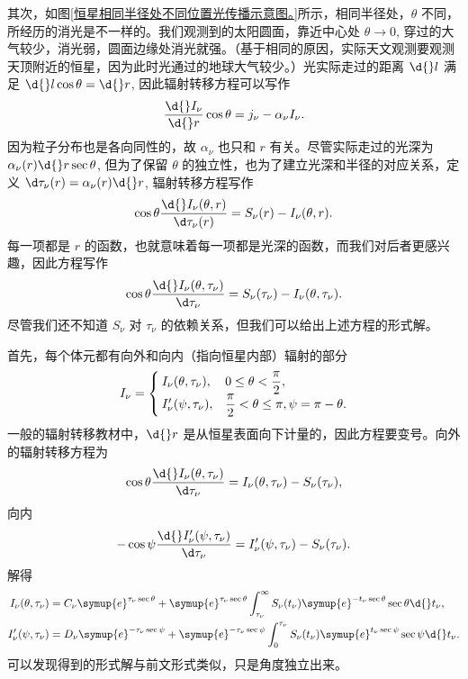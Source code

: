 \documentclass[../天体物理基础.tex]{subfiles}
\begin{document}
其次，如图\ref{恒星相同半径处不同位置光传播示意图。}所示，相同半径处，$\theta$ 不同，所经历的消光是不一样的。我们观测到的太阳圆面，靠近中心处 $\theta\to0$, 穿过的大气较少，消光弱，圆面边缘处消光就强。（基于相同的原因，实际天文观测要观测天顶附近的恒星，因为此时光通过的地球大气较少。）光实际走过的距离 $\d{}l$ 满足 $\d{}l\cos{\theta}=\d{}r$, 因此辐射转移方程可以写作
\begin{equation}
\frac{\d{}I_{\nu}}{\d{}r}\cos{\theta}=j_{\nu}-\alpha_{\nu}I_{\nu}.
\end{equation}
因为粒子分布也是各向同性的，故 $\alpha_{\nu}$ 也只和 $r$ 有关。尽管实际走过的光深为 $\alpha_{\nu}\mleft(r\mright)\d{}r\sec{\theta}$, 但为了保留 $\theta$ 的独立性，也为了建立光深和半径的对应关系，定义 $\d\tau_{\nu}\mleft(r\mright)=\alpha_{\nu}\mleft(r\mright)\d{}r$, 辐射转移方程写作
\begin{equation}
\cos{\theta}\frac{\d{}I_{\nu}\mleft(\theta, r\mright)}{\d\tau_{\nu}\mleft(r\mright)}=S_{\nu}\mleft(r\mright)-I_{\nu}\mleft(\theta, r\mright).
\end{equation}
每一项都是 $r$ 的函数，也就意味着每一项都是光深的函数，而我们对后者更感兴趣，因此方程写作
\begin{equation}
\cos{\theta}\frac{\d{}I_{\nu}\mleft(\theta,\tau_{\nu}\mright)}{\d\tau_{\nu}}=S_{\nu}\mleft(\tau_{\nu}\mright)-I_{\nu}\mleft(\theta,\tau_{\nu}\mright).
\end{equation}
尽管我们还不知道 $S_{\nu}$ 对 $\tau_{\nu}$ 的依赖关系，但我们可以给出上述方程的形式解。

首先，每个体元都有向外和向内（指向恒星内部）辐射的部分
\begin{equation}
I_{\nu}=\begin{cases}
I_{\nu}\mleft(\theta,\tau_{\nu}\mright), & 0\le\theta<\dfrac{\pi}{2},\\
I_{\nu}'\mleft(\psi,\tau_{\nu}\mright), & \dfrac{\pi}{2}<\theta\le\pi,\psi=\pi-\theta.
\end{cases}
\end{equation}
一般的辐射转移教材中，$\d{}r$ 是从恒星表面向下计量的，因此方程要变号。向外的辐射转移方程为
\begin{equation}
\cos{\theta}\frac{\d{}I_{\nu}\mleft(\theta,\tau_{\nu}\mright)}{\d\tau_{\nu}}=I_{\nu}\mleft(\theta,\tau_{\nu}\mright)-S_{\nu}\mleft(\tau_{\nu}\mright),
\end{equation}
向内
\begin{equation}
-\cos{\psi}\frac{\d{}I'_{\nu}\mleft(\psi,\tau_{\nu}\mright)}{\d\tau_{\nu}}=I'_{\nu}\mleft(\psi,\tau_{\nu}\mright)-S_{\nu}\mleft(\tau_{\nu}\mright).
\end{equation}
解得
\begin{align}
I_{\nu}\mleft(\theta,\tau_{\nu}\mright)&=C_{\nu}\symup{e}^{\tau_{\nu}\sec{\theta}}+\symup{e}^{\tau_{\nu}\sec{\theta}}\int_{\tau_{\nu}}^{\infty}S_{\nu}\mleft(t_{\nu}\mright)\symup{e}^{-t_{\nu}\sec{\theta}}\sec{\theta}\d{}t_{\nu},\\
I'_{\nu}\mleft(\psi,\tau_{\nu}\mright)&=D_{\nu}\symup{e}^{-\tau_{\nu}\sec{\psi}}+\symup{e}^{-\tau_{\nu}\sec{\psi}}\int_{0}^{\tau_{\nu}}S_{\nu}\mleft(t_{\nu}\mright)\symup{e}^{t_{\nu}\sec{\psi}}\sec{\psi}\d{}t_{\nu}.
\end{align}
可以发现得到的形式解与前文形式类似，只是角度独立出来。
\end{document}
